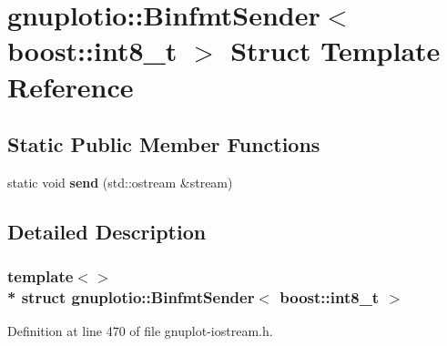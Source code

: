 \hypertarget{structgnuplotio_1_1_binfmt_sender_3_01boost_1_1int8__t_01_4}{}\section{gnuplotio\+:\+:Binfmt\+Sender$<$ boost\+:\+:int8\+\_\+t $>$ Struct Template Reference}
\label{structgnuplotio_1_1_binfmt_sender_3_01boost_1_1int8__t_01_4}
\subsection*{Static Public Member Functions}
\begin{DoxyCompactItemize}
\item 
static void {\bfseries send} (std\+::ostream \&stream)\hypertarget{structgnuplotio_1_1_binfmt_sender_3_01boost_1_1int8__t_01_4_a6f61d43b0da25f044bfad0d45fe888b4}{}\label{structgnuplotio_1_1_binfmt_sender_3_01boost_1_1int8__t_01_4_a6f61d43b0da25f044bfad0d45fe888b4}

\end{DoxyCompactItemize}


\subsection{Detailed Description}
\subsubsection*{template$<$$>$\\*
struct gnuplotio\+::\+Binfmt\+Sender$<$ boost\+::int8\+\_\+t $>$}



Definition at line 470 of file gnuplot-\/iostream.\+h.

